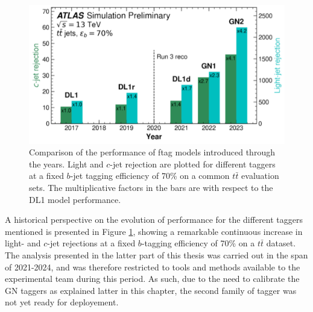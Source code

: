 \begin{figure}[h!]
  \center
  \includegraphics[scale=0.6]{Images/FTAG/storyFtag.png}
  \caption{Comparison of the performance of \gls{ftag} models introduced through the years. Light and $c$-jet rejection are plotted for different taggers at a fixed $b$-jet tagging efficiency of 70\% on a common $t\bar{t}$ evaluation sets. The multiplicative factors in the bars are with respect to the DL1 model performance.} 
  \label{fig:storyFtag}
\end{figure}

A historical perspective on the evolution of performance for the different taggers mentioned is presented in Figure \ref{fig:storyFtag}, showing a remarkable continuous increase in light- and $c$-jet rejections at a fixed $b$-tagging efficiency of 70\% on a $t\bar{t}$ dataset. The analysis presented in the latter part of this thesis was carried out in the span of 2021-2024, and was therefore restricted to tools and methods available to the experimental team during this period. As such, due to the need to calibrate the GN taggers as explained latter in this chapter, the second family of tagger was not yet ready for deployement. 

